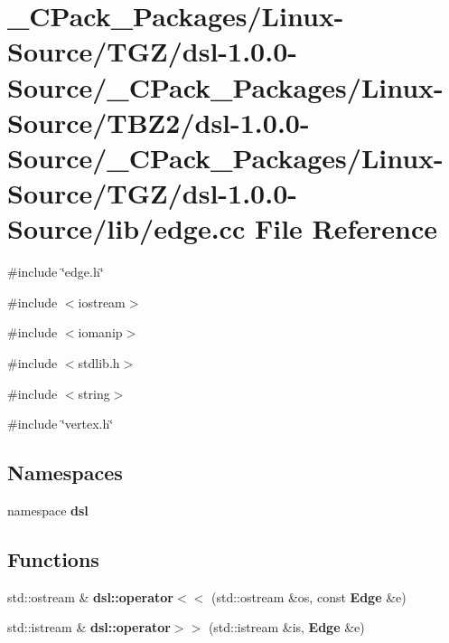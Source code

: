 \section{\_\-CPack\_\-Packages/Linux-\/Source/TGZ/dsl-\/1.0.0-\/Source/\_\-CPack\_\-Packages/Linux-\/Source/TBZ2/dsl-\/1.0.0-\/Source/\_\-CPack\_\-Packages/Linux-\/Source/TGZ/dsl-\/1.0.0-\/Source/lib/edge.cc File Reference}
\label{__CPack__Packages_2Linux-Source_2TGZ_2dsl-1_80_80-Source_2__CPack__Packages_2Linux-Source_2TBZ2_11dc7c74666110167a163e8cebd537fc}
{\ttfamily \#include \char`\"{}edge.h\char`\"{}}\par
{\ttfamily \#include $<$iostream$>$}\par
{\ttfamily \#include $<$iomanip$>$}\par
{\ttfamily \#include $<$stdlib.h$>$}\par
{\ttfamily \#include $<$string$>$}\par
{\ttfamily \#include \char`\"{}vertex.h\char`\"{}}\par
\subsection*{Namespaces}
\begin{DoxyCompactItemize}
\item 
namespace {\bf dsl}
\end{DoxyCompactItemize}
\subsection*{Functions}
\begin{DoxyCompactItemize}
\item 
std::ostream \& {\bf dsl::operator$<$$<$} (std::ostream \&os, const {\bf Edge} \&e)
\item 
std::istream \& {\bf dsl::operator$>$$>$} (std::istream \&is, {\bf Edge} \&e)
\end{DoxyCompactItemize}
